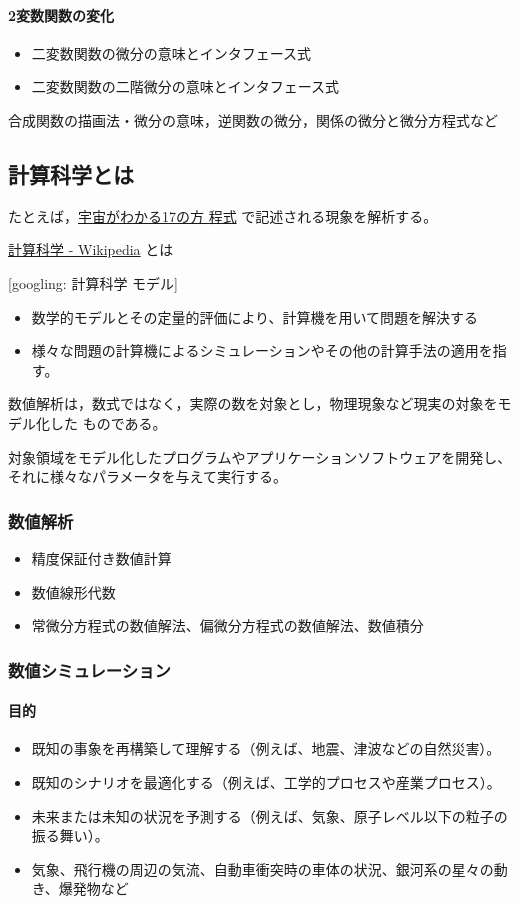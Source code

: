 \documentclass[dvipdfmx,11pat]{jarticle}
\begin{document}
\paragraph{2変数関数の変化}
\label{sec:orga7a1d98}
\begin{itemize}
\item 二変数関数の微分の意味とインタフェース式
\item 二変数関数の二階微分の意味とインタフェース式
\end{itemize}

合成関数の描画法・微分の意味，逆関数の微分，関係の微分と微分方程式など
\subsection{計算科学とは}
\label{sec:orgeaf6192}

たとえば，\href{topics/宇宙がわかる17の方程式.org}{宇宙がわかる17の方
程式} で記述される現象を解析する。

\href{https://ja.wikipedia.org/wiki/\%E8\%A8\%88\%E7\%AE\%97\%E7\%A7\%91\%E5\%AD\%A6}{計算科学 - Wikipedia} とは

{[}googling: 計算科学 モデル] 
\begin{itemize}
\item 数学的モデルとその定量的評価により、計算機を用いて問題を解決する
\item 様々な問題の計算機によるシミュレーションやその他の計算手法の適用を指
す。
\end{itemize}

数値解析は，数式ではなく，実際の数を対象とし，物理現象など現実の対象をモデル化した
ものである。

対象領域をモデル化したプログラムやアプリケーションソフトウェアを開発し、
それに様々なパラメータを与えて実行する。
\subsubsection{数値解析}
\label{sec:orgbc9cf48}
\begin{itemize}
\item 精度保証付き数値計算
\item 数値線形代数
\item 常微分方程式の数値解法、偏微分方程式の数値解法、数値積分
\end{itemize}
\subsubsection{数値シミュレーション}
\label{sec:org9a62063}
\paragraph{目的}
\label{sec:orgdfbdc80}
\begin{itemize}
\item 既知の事象を再構築して理解する（例えば、地震、津波などの自然災害）。
\item 既知のシナリオを最適化する（例えば、工学的プロセスや産業プロセス）。
\item 未来または未知の状況を予測する（例えば、気象、原子レベル以下の粒子の振る舞い）。
\item 気象、飛行機の周辺の気流、自動車衝突時の車体の状況、銀河系の星々の動き、爆発物など
\end{itemize}
\end{document}
